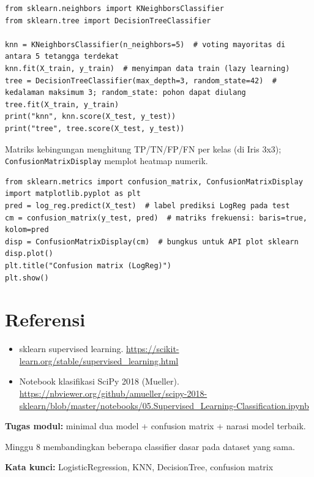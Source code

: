 \documentclass[../main.tex]{subfiles}
\begin{document}
\begin{lstlisting}[caption=KNeighborsClassifier dan DecisionTree]
from sklearn.neighbors import KNeighborsClassifier
from sklearn.tree import DecisionTreeClassifier

knn = KNeighborsClassifier(n_neighbors=5)  # voting mayoritas di antara 5 tetangga terdekat
knn.fit(X_train, y_train)  # menyimpan data train (lazy learning)
tree = DecisionTreeClassifier(max_depth=3, random_state=42)  # kedalaman maksimum 3; random_state: pohon dapat diulang
tree.fit(X_train, y_train)
print("knn", knn.score(X_test, y_test))
print("tree", tree.score(X_test, y_test))
\end{lstlisting}

\MulaiPenjelasanKode Matriks kebingungan menghitung TP/TN/FP/FN per kelas (di Iris 3x3); \texttt{ConfusionMatrixDisplay} memplot heatmap numerik. \SelesaiPenjelasanKode

\begin{lstlisting}[caption=Confusion matrix]
from sklearn.metrics import confusion_matrix, ConfusionMatrixDisplay
import matplotlib.pyplot as plt
pred = log_reg.predict(X_test)  # label prediksi LogReg pada test
cm = confusion_matrix(y_test, pred)  # matriks frekuensi: baris=true, kolom=pred
disp = ConfusionMatrixDisplay(cm)  # bungkus untuk API plot sklearn
disp.plot()
plt.title("Confusion matrix (LogReg)")
plt.show()
\end{lstlisting}

\section{Referensi}

\begin{itemize}[leftmargin=*]
  \item sklearn supervised learning. \url{https://scikit-learn.org/stable/supervised_learning.html}
  \item Notebook klasifikasi SciPy 2018 (Mueller). \url{https://nbviewer.org/github/amueller/scipy-2018-sklearn/blob/master/notebooks/05.Supervised_Learning-Classification.ipynb}
\end{itemize}

\begin{asesmen}
\textbf{Tugas modul:} minimal dua model + confusion matrix + narasi model terbaik.
\end{asesmen}

\begin{rangkuman}
Minggu 8 membandingkan beberapa classifier dasar pada dataset yang sama.

\textbf{Kata kunci:} LogisticRegression, KNN, DecisionTree, confusion matrix
\end{rangkuman}
\end{document}
